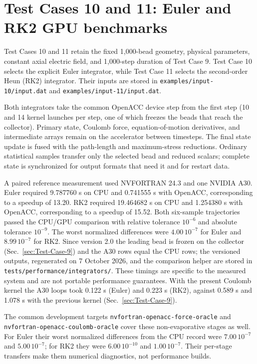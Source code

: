 \section{Test Cases 10 and 11: Euler and RK2 GPU benchmarks}

Test Cases 10 and 11 retain the fixed 1,000-bead geometry, physical
parameters, constant axial electric field, and 1,000-step duration of Test
Case 9. Test Case 10 selects the explicit Euler integrator, while Test Case 11
selects the second-order Heun (RK2) integrator. Their inputs are stored in
\texttt{examples/input-10/input.dat} and
\texttt{examples/input-11/input.dat}.

Both integrators take the common OpenACC device step from the first step (10
and 14 kernel launches per step, one of which freezes the beads that reach
the collector). Primary state, Coulomb force, equation-of-motion derivatives,
and intermediate arrays remain on the accelerator between timesteps. The
final state update is fused with the path-length and maximum-stress
reductions. Ordinary statistical samples transfer only the selected bead and
reduced scalars; complete state is synchronized for output formats that need
it and for restart data.

A paired reference measurement used NVFORTRAN 24.3 and one NVIDIA A30. Euler
required 9.787760 s on CPU and 0.741555 s with OpenACC, corresponding to a
speedup of 13.20. RK2 required 19.464682 s on CPU and 1.254380 s with OpenACC,
corresponding to a speedup of 15.52. Both six-sample trajectories passed the
CPU/GPU comparison with relative tolerance $10^{-6}$ and absolute tolerance
$10^{-9}$. The worst normalized differences were $4.00\,10^{-7}$ for Euler
and $8.99\,10^{-7}$ for RK2. Since version 2.0 the leading bead is frozen
on the collector (Sec.~\ref{sec:Test-Case-9}) and the A30 rows equal the CPU rows; the
versioned outputs, regenerated on 7 October 2026, and the comparison helper are stored in
\texttt{tests/performance/integrators/}. These timings are specific
to the measured system and are not portable performance guarantees. With
the present Coulomb kernel the A30 loops took 0.122 s (Euler) and 0.223 s
(RK2), against 0.589 s and 1.078 s with the previous kernel
(Sec.~\ref{sec:Test-Case-9}).

The common development targets \texttt{nvfortran-openacc-force-oracle} and
\texttt{nvfortran-openacc-coulomb-oracle} cover these non-evaporative stages
as well. For Euler their worst normalized differences from the CPU record were
$7.00\,10^{-7}$ and $5.00\,10^{-7}$; for RK2 they were $6.00\,10^{-10}$ and
$1.00\,10^{-7}$. Their per-stage transfers make them numerical diagnostics,
not performance builds.
